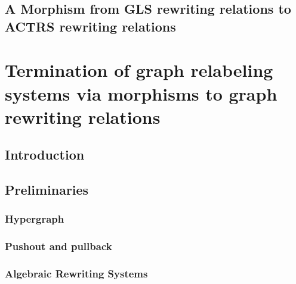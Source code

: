\documentclass{book}
\begin{document}
\chapter{A Morphism from GLS rewriting relations to ACTRS rewriting relations}

    \label{sec:morphism_from_gls_to_actrs}
    

\part{Termination of graph relabeling systems via morphisms to graph rewriting relations}

\chapter{Introduction}


\chapter{Preliminaries} 
    \label{sec:grs}

    \section{Hypergraph}
        \label{sec:hypergraph}
        
    
    \section{Pushout and pullback}
        \label{sec:category_theory}
        

    \section{Algebraic Rewriting Systems} 
\end{document}
